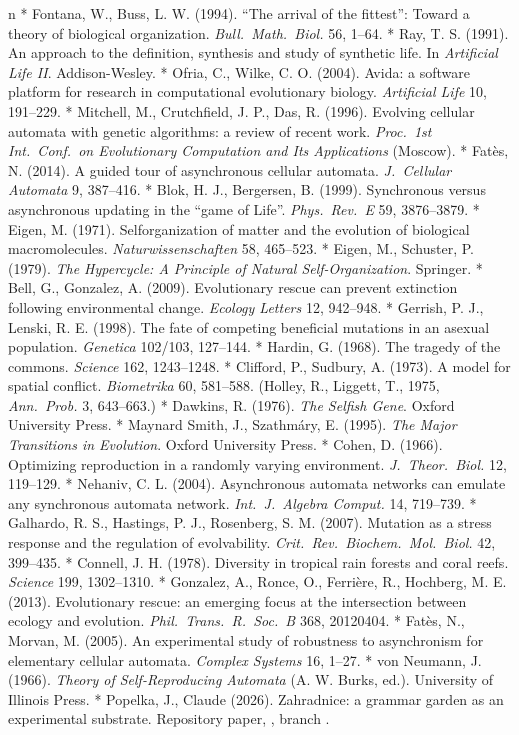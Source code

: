 \begitems\style n
* Fontana, W., Buss, L. W. (1994). “The arrival of the fittest”:
Toward a theory of biological organization. {\it Bull.\ Math.\
Biol.} 56, 1--64.
* Ray, T. S. (1991). An approach to the definition, synthesis and
study of synthetic life. In {\it Artificial Life II}.
Addison-Wesley.
* Ofria, C., Wilke, C. O. (2004). Avida: a software platform for
research in computational evolutionary biology. {\it Artificial
Life} 10, 191--229.
* Mitchell, M., Crutchfield, J. P., Das, R. (1996). Evolving
cellular automata with genetic algorithms: a review of recent
work. {\it Proc.\ 1st Int.\ Conf.\ on Evolutionary Computation and
Its Applications} (Moscow).
* Fatès, N. (2014). A guided tour of asynchronous cellular
automata. {\it J.\ Cellular Automata} 9, 387--416.
* Blok, H. J., Bergersen, B. (1999). Synchronous versus
asynchronous updating in the “game of Life”. {\it Phys.\ Rev.\
E} 59, 3876--3879.
* Eigen, M. (1971). Selforganization of matter and the evolution
of biological macromolecules. {\it Naturwissenschaften} 58,
465--523.
* Eigen, M., Schuster, P. (1979). {\it The Hypercycle: A Principle
of Natural Self-Organization}. Springer.
* Bell, G., Gonzalez, A. (2009). Evolutionary rescue can prevent
extinction following environmental change. {\it Ecology Letters}
12, 942--948.
* Gerrish, P. J., Lenski, R. E. (1998). The fate of competing
beneficial mutations in an asexual population. {\it Genetica}
102/103, 127--144.
* Hardin, G. (1968). The tragedy of the commons. {\it Science}
162, 1243--1248.
* Clifford, P., Sudbury, A. (1973). A model for spatial conflict.
{\it Biometrika} 60, 581--588. (Holley, R., Liggett, T., 1975,
{\it Ann.\ Prob.} 3, 643--663.)
* Dawkins, R. (1976). {\it The Selfish Gene}. Oxford University
Press.
* Maynard Smith, J., Szathmáry, E. (1995). {\it The Major
Transitions in Evolution}. Oxford University Press.
* Cohen, D. (1966). Optimizing reproduction in a randomly varying
environment. {\it J.\ Theor.\ Biol.} 12, 119--129.
* Nehaniv, C. L. (2004). Asynchronous automata networks can
emulate any synchronous automata network. {\it Int.\ J.\ Algebra
Comput.} 14, 719--739.
* Galhardo, R. S., Hastings, P. J., Rosenberg, S. M. (2007).
Mutation as a stress response and the regulation of evolvability.
{\it Crit.\ Rev.\ Biochem.\ Mol.\ Biol.} 42, 399--435.
* Connell, J. H. (1978). Diversity in tropical rain forests and
coral reefs. {\it Science} 199, 1302--1310.
* Gonzalez, A., Ronce, O., Ferrière, R., Hochberg, M. E. (2013).
Evolutionary rescue: an emerging focus at the intersection between
ecology and evolution. {\it Phil.\ Trans.\ R.\ Soc.\ B} 368,
20120404.
* Fatès, N., Morvan, M. (2005). An experimental study of
robustness to asynchronism for elementary cellular automata.
{\it Complex Systems} 16, 1--27.
* von Neumann, J. (1966). {\it Theory of Self-Reproducing
Automata} (A. W. Burks, ed.). University of Illinois Press.
* Popelka, J., Claude (2026). Zahradnice: a grammar garden as an
experimental substrate. Repository paper,
\repo{paper/zahradnice-substrate.tex}, branch \repo{research}.
\enditems

